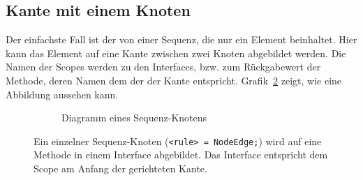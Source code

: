 \documentclass[../InterneDSLs.tex]{subfiles}
\begin{document}
\subsection{Kante mit einem Knoten}\label{SEC:OneNode}
Der einfachste Fall ist der von einer Sequenz, die nur ein Element beinhaltet. Hier kann das Element auf eine Kante zwischen zwei Knoten abgebildet werden. Die Namen der Scopes werden zu den Interfaces, bzw. zum Rückgabewert der Methode, deren Namen dem der der Kante entspricht. Grafik~\ref{FIG:OneElementNode} zeigt, wie eine Abbildung aussehen kann.
\begin{figure}[ht]
\centering
  \begin{subfigure}[c]{0.49\textwidth}
    \caption{Diagramm eines Sequenz-Knotens}
    \label{FIG:DiagramOneElementNode}
  \end{subfigure}
  \begin{subfigure}[c]{0.49\textwidth}
    
  \end{subfigure}
  \caption{Ein einzelner Sequenz-Knoten (\texttt{<rule> = NodeEdge;}) wird auf eine Methode in einem Interface abgebildet. Das Interface entspricht dem Scope am Anfang der gerichteten Kante.}
  \label{FIG:OneElementNode}
\end{figure}
\end{document}
